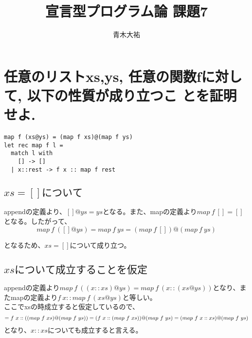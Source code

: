 \documentclass[a4paper,7pt]{jarticle}
\author{青木大祐}
\title{宣言型プログラム論 課題7}
\begin{document}
\maketitle
\newpage
\section{任意のリストxs,ys, 任意の関数fに対して, 以下の性質が成り立つこ
 とを証明せよ.}
\begin{lstlisting}
map f (xs@ys) = (map f xs)@(map f ys)
let rec map f l =
  match l with
    [] -> []
  | x::rest -> f x :: map f rest 
\end{lstlisting}

\subsection{$xs=[]について$}
appendの定義より、$[]@ys=ys$となる。また、mapの定義より$map\ f\ [] = []$
となる。したがって、
\begin{equation*}
map\ f\ ([]@ys) = map\ f\ ys = (map\ f\ []) @ (map\ f\ ys) 
\end{equation*}

となるため、$xs=[]$について成り立つ。

\subsection{$xsについて成立することを仮定$}
appendの定義より$map\ f\ ((x::xs)@ys)  = map\ f\ (x::(xs@ys))$となり、ま
たmapの定義より$f\ x::map\ f\ (xs@ys)$と等しい。\\
ここでxsの時成立すると仮定しているので、
\begin{equation*}
                         = f\ x::((map\ f\ xs) @ (map\ f\ ys) )\\
                        = ( f\ x::(map\ f\ xs) ) @ (map\ f\ ys)\\
                        = (map\ f\ x::xs) @ (map\ f\ ys) \\
\end{equation*}
となり、$x::xs$についても成立すると言える。
\end{document}

